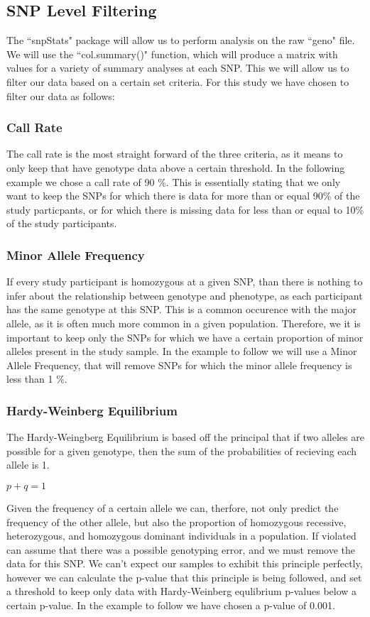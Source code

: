 \documentclass[11pt]{article}\usepackage[]{graphicx}\usepackage[]{color}
\begin{document}
\subsection{SNP Level Filtering}
The ``snpStats" package will allow us to perform analysis on the raw ``geno" file.  We will use the ``col.summary()" function, which will produce a matrix with values for a variety of summary analyses at each SNP.
This we will allow us to filter our data based on a certain set criteria.  For this study we have chosen to filter our data as follows: 
\subsubsection*{Call Rate}
The call rate is the most straight forward of the three criteria, as it means to only keep that have genotype data above a certain threshold. In the following example we chose a call rate of 90 \%.  This is essentially stating that we only want to keep the SNPs for which there is data for more than or equal 90\% of the study particpants, or for which there is missing data for less than or equal to 10\% of the study participants.
\subsubsection*{Minor Allele Frequency}
If every study participant is homozygous at a given SNP, than there is nothing to infer about the relationship between genotype and phenotype, as each participant has the same genotype at this SNP.  This is a common occurence with the major allele, as it is often much more common in a given population.  Therefore, we it is important to keep only the SNPs for which we have a certain proportion of minor alleles present in the study sample.  In the example to follow we will use a Minor Allele Frequency, that will remove SNPs for which the minor allele frequency is less than 1 \%.
\subsubsection*{Hardy-Weinberg Equilibrium}
The Hardy-Weingberg Equilibrium is based off the principal that if two alleles are possible for a given genotype, then the sum of the probabilities of recieving each allele is 1.
\centerline{$p+q=1$}
Given the frequency of a certain allele we can, therfore, not only predict the frequency of the other allele, but also the proportion of homozygous recessive, heterozygous, and homozygous dominant individuals in a population. If violated can assume that there was a possible genotyping error, and we must remove the data for this SNP. We can't expect our samples to exhibit this principle perfectly, however we can calculate the p-value that this principle is being followed, and set a threshold to keep only data with Hardy-Weinberg equlibrium p-values below a certain p-value. In the example to follow we have chosen a p-value of 0.001.
\end{document}
